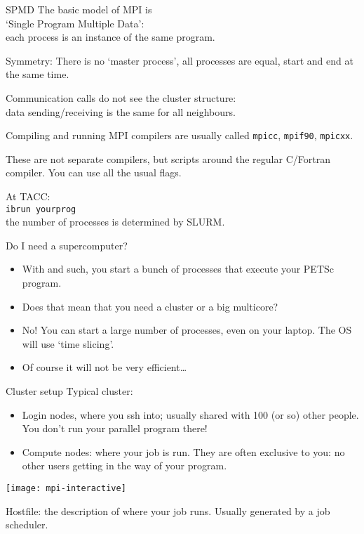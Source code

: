 \begin{numberedframe}{SPMD}
  The basic model of MPI is\\
  `Single Program Multiple Data':\\
  each process is an instance of the same program.

  Symmetry: There is no `master process', all processes are equal,
  start and end
  at the same time.

  Communication calls do not see the cluster structure:\\
  data sending/receiving is the same for all neighbours.
\end{numberedframe}

\begin{numberedframe}{Compiling and running}
  MPI compilers are usually called \texttt{mpicc},
  \texttt{mpif90}, \texttt{mpicxx}.

  These are not separate compilers,
  but scripts around the regular C/Fortran compiler. You can use all
  the usual flags.

  At TACC:\\
  \verb+ibrun yourprog+\\
  the number of processes is determined by SLURM.
\end{numberedframe}

\begin{numberedframe}{Do I need a supercomputer?}
  \begin{itemize}
  \item With  and such, you start a bunch of processes that
    execute your PETSc program.
  \item Does that mean that you need a cluster or a big multicore?
  \item No! You can start a large number of processes, even on
    your laptop. The OS will use `time slicing'.
  \item Of course it will not be very efficient\ldots
  \end{itemize}
\end{numberedframe}

\begin{numberedframe}{Cluster setup}
  \small
  Typical cluster:
  \begin{itemize}
  \item Login nodes, where you ssh into; usually shared with 100 (or
    so) other people. You don't run your parallel program there!
  \item Compute nodes: where your job is run. They are often exclusive
    to you: no other users getting in the way of your program.
  \end{itemize}
  \texttt{[image: mpi-interactive]}

  Hostfile: the description of where your job runs. Usually generated
  by a job scheduler.
\end{numberedframe}

